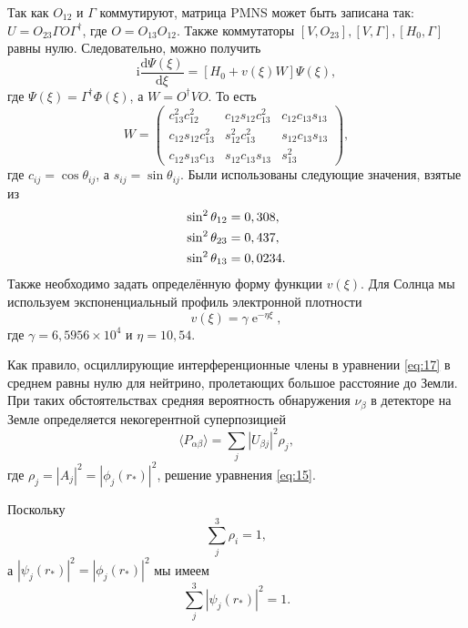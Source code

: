\documentclass[a4paper,12pt]{article}
\newcommand{\dd}{\mathrm{d}}
\renewcommand{\exp}{\operatorname{e}}
\renewcommand{\imath}{\mathrm{i}}
\begin{document}
Так как \(O_{12}\) и \(\Gamma\) коммутируют, матрица PMNS может быть записана  так: \(U=O_{23}\Gamma O \Gamma^{\dagger}\), где \(O=O_{13}O_{12}\). Также коммутаторы  \([V,O_{23}], [V,\Gamma], [H_0,\Gamma]\) равны нулю. Следовательно, можно получить
	\begin{equation}\label{eq:15}
		\imath\frac{\dd\Psi(\xi)}{\dd\xi}=[H_{0}+ v(\xi)W]\Psi(\xi),
	\end{equation}
	где \(\Psi(\xi)=\Gamma^{\dagger}\Phi(\xi)\), а \(W=O^{\dagger}VO\). То есть
	 \begin{equation*}\label{eq:16}
  		W=
  		\begin{pmatrix}
  		c_{13}^{2}c_{12}^{2} & c_{12}s_{12}c_{13}^{2} & c_{12}c_{13}s_{13}\\
  		c_{12}s_{12}c_{13}^{2} & s_{12}^{2}c_{13}^{2} & s_{12}c_{13}s_{13}\\
  		c_{12}s_{13}c_{13} & s_{12}c_{13}s_{13} & s_{13}^{2}
  		\end{pmatrix},
  	\end{equation*}
	где \(c_{ij}=\cos\theta_{ij}\), а \(s_{ij}=\sin\theta_{ij}\). Были использованы следующие значения, взятые из \cite{Casas:2016asi}
	\begin{equation}
		\begin{lgathered}
			\sin^2\theta_{12}=0,308,\\
			\sin^2\theta_{23}=0,437,\\
			\sin^2\theta_{13}=0,0234.
		\end{lgathered}
	\end{equation}
Также необходимо задать определённую форму функции \(v(\xi)\). Для Солнца мы используем экспоненциальный профиль электронной плотности
	\begin{equation}
		v(\xi)=\gamma \exp^{-\eta \xi},
	\end{equation}
 	где \(\gamma=6,5956 \times 10^4\) и \(\eta=10,54\).

	Как правило, осциллирующие интерференционные члены в уравнении \eqref{eq:17} в среднем равны нулю для нейтрино, пролетающих большое расстояние до Земли. При таких обстоятельствах средняя вероятность обнаружения \(\nu_\beta\) в детекторе на Земле определяется некогерентной суперпозицией
	\begin{equation}
		\langle P_{\alpha\beta} \rangle=\sum_{j}|U_{\beta j}|^{2} \rho_{j},
	\end{equation}
	где \(\rho_{j}=|A_{j}|^{2}=|\phi_{j}(r_{*})|^2\), решение уравнения
	\eqref{eq:15}.

	Поскольку
	\begin{equation}
		\sum_{j}^{3} \rho_i=1,
	\end{equation}
	а \(|\psi_{j}(r_{*})|^2=|\phi_{j}(r_{*})|^2\) мы имеем
	\begin{equation}\label{eq:18}
		\sum_{j}^{3} |\psi_{j}(r_{*})|^2=1.
	\end{equation}
\end{document}

